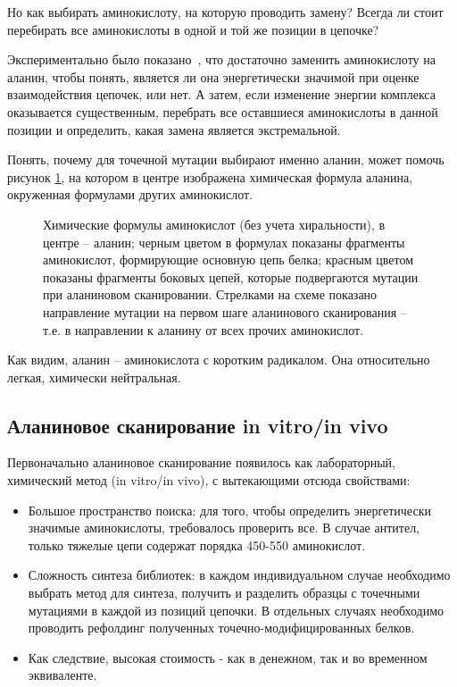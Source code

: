Но как выбирать аминокислоту, на которую проводить замену? Всегда ли стоит перебирать все аминокислоты в одной и той же позиции в цепочке?

Экспериментально было показано~\cite{alascan2001}, что достаточно заменить аминокислоту на аланин, чтобы понять, является ли она энергетически значимой при оценке взаимодействия цепочек, или нет. А затем, если изменение энергии комплекса  оказывается существенным, перебрать все оставшиеся аминокислоты в данной позиции и определить, какая замена является экстремальной.

Понять, почему для точечной мутации выбирают именно аланин, может помочь рисунок \ref{fig:aminoacids}, на котором в центре изображена химическая формула аланина, окруженная формулами других аминокислот.

\begin{figure}
 \resizebox{!}{0.9\textwidth}{
 \ttfamily
 \footnotesize
 \aapicture
 }
\caption{\small{Химические формулы аминокислот (без учета хиральности), в центре -- аланин; черным цветом в формулах показаны фрагменты аминокислот, формирующие основную цепь белка; красным цветом показаны фрагменты боковых цепей, которые подвергаются мутации при аланиновом сканировании. Стрелками на схеме показано направление мутации на первом шаге аланинового сканирования -- т.е. в направлении к аланину от всех прочих аминокислот. }}
\label{fig:aminoacids}
\end{figure}

Как видим, аланин -- аминокислота с коротким радикалом. Она относительно легкая, химически нейтральная. 

\subsection{Аланиновое сканирование in vitro/in vivo}
Первоначально аланиновое сканирование появилось как лабораторный, химический метод (in vitro/in vivo), с вытекающими отсюда свойствами:
\begin{itemize}
\item Большое пространство поиска: для того, чтобы определить энергетически значимые аминокислоты, требовалось проверить все. В случае антител, только тяжелые цепи содержат порядка 450-550 аминокислот.
\item Сложность синтеза библиотек: в каждом индивидуальном случае необходимо выбрать метод для синтеза, получить и разделить образцы с точечными мутациями в каждой из позиций цепочки. В отдельных случаях необходимо проводить рефолдинг полученных точечно-модифицированных белков.
\item Как следствие, высокая стоимость - как в денежном, так и во временном эквиваленте.
\end{itemize}

